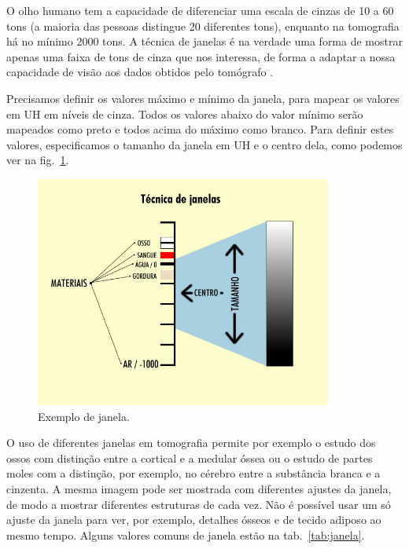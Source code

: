 O olho humano tem a capacidade de diferenciar uma escala de cinzas de 10 a 60 tons (a maioria das pessoas distingue 20 diferentes tons), enquanto na tomografia há no mínimo 2000 tons. A técnica de janelas é na verdade uma forma de mostrar apenas uma faixa de tons de cinza que nos interessa, de forma a adaptar a nossa capacidade de visão aos dados obtidos pelo tomógrafo \cite{tomo}.

Precisamos definir os valores máximo e mínimo da janela, para mapear os valores em UH em níveis de cinza. Todos os valores abaixo do valor mínimo serão mapeados como preto e todos acima do máximo como branco. Para definir estes valores, especificamos o tamanho da janela em UH e o centro dela, como podemos ver na fig.~\ref{fig:tc_janela}.

\begin{figure}[ht]
 \begin{center}
  \includegraphics[height=3.0in]{imagens/tc_janela.jpg}
 \end{center}
 \caption{Exemplo de janela.}
 \label{fig:tc_janela}
\end{figure}

O uso de diferentes janelas em tomografia permite por exemplo o estudo dos ossos com distinção entre a cortical e a medular óssea ou o estudo de partes moles com a distinção, por exemplo, no cérebro entre a substância branca e a cinzenta. A mesma imagem pode ser mostrada com diferentes ajustes da janela, de modo a mostrar diferentes estruturas de cada vez. Não é possível usar um só ajuste da janela para ver, por exemplo, detalhes ósseos e de tecido adiposo ao mesmo tempo. Alguns valores comuns de janela estão na tab.~\ref{tab:janela}.

